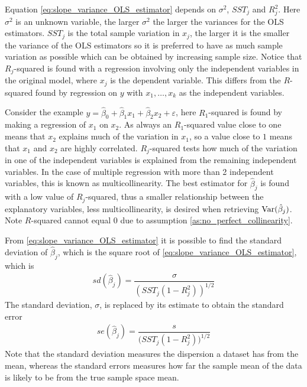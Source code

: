 Equation \eqref{eq:slope_variance_OLS_estimator} depends on $\sigma^2$, $SST_j$ and $R^2_j$.
Here $\sigma^2$ is an unknown variable, the larger $\sigma^2$ the larger the variances for the OLS estimators. 
$SST_j$ is the total sample variation in $x_j$, the larger it is the smaller the variance of the OLS estimators so it is preferred to have as much sample variation as possible which can be obtained by increasing sample size. 
Notice that $R_j$-squared is found with a regression involving only the independent variables in the original model, where $x_j$ is the dependent variable. 
This differs from the $R$-squared found by regression on $y$ with $x_1, \ldots, x_k$ as the independent variables. 

Consider the example $y = \hat{\beta}_0 + \hat{\beta}_1 x_1 + \hat{\beta}_2 x_2 + \varepsilon$, here $R_1$-squared is found by making a regression of $x_1$ on $x_2$. 
As always an $R_1$-squared value close to one means that $x_2$ explains much of the variation in $x_1$, so a value close to $1$ means that $x_1$ and $x_2$ are highly correlated.
$R_j$-squared tests how much of the variation in one of the independent variables is explained from the remaining independent variables.
In the case of multiple regression with more than 2 independent variables, this is known as multicollinearity.
The best estimator for $\hat{\beta}_j$ is found with a low value of $R_j$-squared, thus a smaller relationship between the explanatory variables, less multicollinearity, is desired when retrieving $\operatorname{\text{Var}}(\hat{\beta}_j)$.
Note $R$-squared cannot equal $0$ due to assumption \ref{as:no_perfect_collinearity}. 

From \eqref{eq:slope_variance_OLS_estimator} it is possible to find the standard deviation of $\hat{\beta}_j$, which is the square root of \ref{eq:slope_variance_OLS_estimator}, which is
\begin{align}\label{eq:standard_deviation}
    sd(\hat{\beta}_j) = \dfrac{\sigma}{\left(SST_j(1- R_j^2)\right)^{1/2}}
\end{align}
The standard deviation, $\sigma$, is replaced by its estimate to obtain the standard error
\begin{align}\label{eq:standad_error}
    se(\hat{\beta}_j) = \dfrac{s}{\big(SST_j(1- R_j^2)\big)^{1/2}}
\end{align}
Note that the standard deviation measures the dispersion a dataset has from the mean, whereas the standard errors measures how far the sample mean of the data is likely to be from the true sample space mean. 

